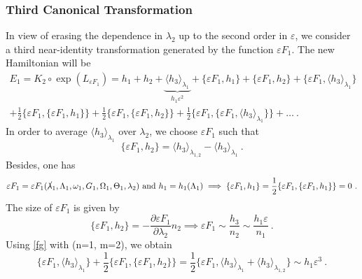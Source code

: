 \documentclass[a4paper]{article}
\begin{document}
\subsubsection{Third Canonical Transformation}
\label{SCT}
In view of erasing the dependence in $\lambda_{2}$ up to the second order in $\varepsilon$, we consider a third near-identity transformation generated by the function $\varepsilon F_{1}$. 
The new Hamiltonian will be
\begin{multline}
E_{1}=K_{2} \circ \exp (L_{\varepsilon F_{1}})=h_{1}+h_{2}+\underbrace{ \langle h_{3} \rangle _{\lambda_{1}}}_{h_{1}\varepsilon^{2}}
+\{\varepsilon F_{1},h_{1}\}+\{\varepsilon F_{1},h_{2}\}+\{\varepsilon F_{1}, \langle h_{3} \rangle _{\lambda_{1}}\} \\
+\frac{1}{2}\{\varepsilon F_{1},\{\varepsilon F_{1},h_{1}\}\}+\frac{1}{2}\{\varepsilon F_{1},\{\varepsilon F_{1},h_{2}\}\}+\frac{1}{2}\{\varepsilon F_{1},\{\varepsilon F_{1}, \langle h_{3} \rangle _{\lambda_{1}}\}\}+\ldots \ .
\label{E1}
\end{multline}
In order to average $ \langle h_{3} \rangle _{\lambda_{1}}$ over $\lambda_{2}$, we choose $\varepsilon F_{1}$ such that
\begin{equation}
\label{he3}
\{\varepsilon F_{1},h_{2}\}= \langle h_{3} \rangle _{\lambda_{1,2}}- \langle h_{3} \rangle _{\lambda_{1}} \ .
\end{equation}
Besides, one has
\begin{equation} \label{f1dep}
\varepsilon F_{1}=\varepsilon F_{1}(\cancel\lambda_{1},\Lambda_{1},\omega_{1},G_{1},\Omega_{1},\Theta_{1},\lambda_{2}) \ \text{and} \ h_{1}=h_{1}(\Lambda_{1}) \implies
\{\varepsilon F_{1},h_{1}\}=\frac{1}{2}\{\varepsilon F_{1},\{\varepsilon F_{1},h_{1}\}\}=0 \ .
\end{equation}
The size of $\varepsilon F_{1}$ is given by
\begin{equation}
\{\varepsilon F_{1},h_{2}\}=-\frac{\partial \varepsilon F_{1}}{\partial \lambda_{2}}n_{2}
\implies
\varepsilon F_{1} \sim \frac{h_{3}}{n_{2}} \sim \frac{h_{1}\varepsilon}{n_{1}} \ .
\end{equation}
Using \eqref{fg} with (n=1, m=2), we obtain
\begin{equation}
\label{pb2}
\{\varepsilon F_{1}, \langle h_{3} \rangle _{\lambda_{1}}\} + \frac{1}{2}\{\varepsilon F_{1},\{\varepsilon F_{1},h_{2}\}\} = \frac{1}{2}\{\varepsilon F_{1}, \langle h_{3} \rangle _{\lambda_{1}}+ \langle h_{3} \rangle _{\lambda_{1,2}}\} \sim h_{1}\varepsilon^{3}  \ .
\end{equation}
\end{document}

